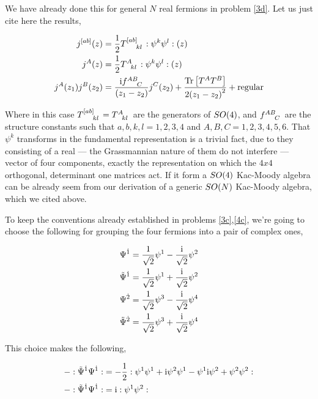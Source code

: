 \problem{}
\probitem{}

We have already done this for general $N$ real fermions in problem \ref{3d}. Let us just cite here the 
results,

\begin{align*}
    j^{\qty[ab]}\qty(z)&=\frac1 2\tensor{T}{^{\qty[ab]}_k_l}\cnord{\psi^k\psi^l}\qty(z)\\
    j^A\qty(z)&=\frac1 2\tensor{T}{^A_k_l}\cnord{\psi^k\psi^l}\qty(z)\\
    j^A\qty(z_1)j ^B\qty(z_2)&=\frac{\im\tensor{f}{^A^B_C}}{\qty(z_1-z_2)}j^C\qty(z_2)+\frac{\Tr\qty[T^A T^B]}{2\qty(z_1-z_2)^2}+\textnormal{regular}
\end{align*}

Where in this case $\tensor{T}{^{\qty[ab]}_k_l}=\tensor{T}{^A_k_l}$ are the generators of $SO\qty(4)$, and $\tensor{f}{^A^B_C}$ are the structure constants such 
that $a,b,k,l=1,2,3,4$ and $A,B,C=1,2,3,4,5,6$. That $\psi^k$ transforms in the fundamental representation is a 
trivial fact, due to they consisting of a real --- the Grassmannian nature of them do not interfere --- vector of four components, exactly the 
representation on which the $4x4$ orthogonal, determinant one matrices act. If it form a $SO\qty(4)$ Kac-Moody algebra can 
be already seem from our derivation of a generic $SO\qty(N)$ Kac-Moody algebra, which we cited above.

\probitem{}

To keep the conventions already established in problems \ref{3c},\ref{4c}, we're going to choose the following 
for grouping the four fermions into a pair of complex ones,

\begin{align*}
    {\Psi}^{\dot 1}=\frac{1}{\sqrt{2}}\psi^1-\frac{\textnormal{i}}{\sqrt2}\psi^2\\
    {\tilde\Psi}^{\dot 1}=\frac{1}{\sqrt{2}}\psi^1+\frac{\textnormal{i}}{\sqrt2}\psi^2\\
    {\Psi}^{\dot 2}=\frac{1}{\sqrt{2}}\psi^3-\frac{\textnormal{i}}{\sqrt2}\psi^4\\
    {\tilde\Psi}^{\dot 2}=\frac{1}{\sqrt{2}}\psi^3+\frac{\textnormal{i}}{\sqrt2}\psi^4
\end{align*}

This choice makes the following,


\begin{align*}
    -:{\tilde\Psi}^{\dot 1}\Psi^{\dot 1}:&=-\frac12:\psi^1\psi^1+\textnormal{i}\psi^2\psi^1-\psi^1\textnormal{i}\psi^2+\psi^2\psi^2:\\
    -:{\tilde\Psi}^{\dot 1}\Psi^{\dot 1}:&=\textnormal{i}:\psi^1\psi^2:
\end{align*}

